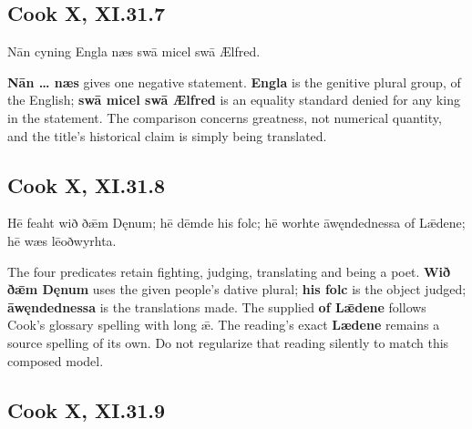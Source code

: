 \subsection*{Cook X, XI.31.7}

\par\begin{minipage}{\linewidth}\raggedright
Nān cyning Engla næs swā micel swā Ælfred.

\textbf{Nān … næs} gives one negative statement. \textbf{Engla} is the genitive plural group, of the English; \textbf{swā micel swā Ælfred} is an equality standard denied for any king in the statement. The comparison concerns greatness, not numerical quantity, and the title’s historical claim is simply being translated.

\end{minipage}\par\addvspace{4pt}

\subsection*{Cook X, XI.31.8}

\par\begin{minipage}{\linewidth}\raggedright
Hē feaht wið ðǣm Dęnum; hē dēmde his folc; hē worhte āwęndednessa of Lǣdene; hē wæs lēoðwyrhta.

The four predicates retain fighting, judging, translating and being a poet. \textbf{Wið ðǣm Dęnum} uses the given people’s dative plural; \textbf{his folc} is the object judged; \textbf{āwęndednessa} is the translations made. The supplied \textbf{of Lǣdene} follows Cook’s glossary spelling with long ǣ. The reading’s exact \textbf{Lædene} remains a source spelling of its own. Do not regularize that reading silently to match this composed model.

\end{minipage}\par\addvspace{4pt}

\subsection*{Cook X, XI.31.9}

